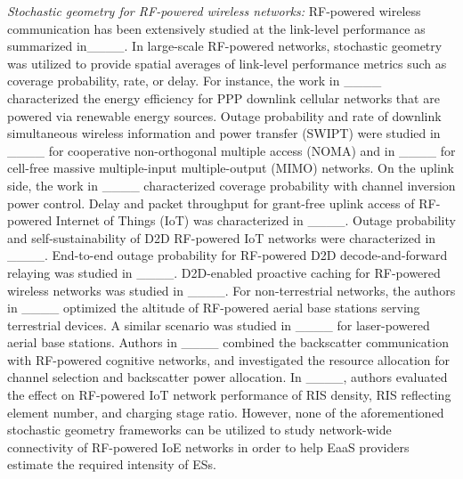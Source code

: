 \indent \textit{Stochastic geometry for
RF-powered wireless networks:} RF-powered wireless communication has been extensively studied at the link-level performance as summarized in____. In large-scale RF-powered networks, stochastic geometry was utilized to provide spatial averages of link-level performance metrics such as coverage probability, rate, or delay. For instance, the work in ____ characterized the energy efficiency for PPP downlink cellular networks that are powered via renewable energy sources. Outage probability and rate of downlink simultaneous wireless information and power transfer (SWIPT) were studied in ____ for cooperative non-orthogonal multiple access (NOMA) and in ____ for cell-free massive multiple-input multiple-output (MIMO) networks. On the uplink side, the work in ____ characterized coverage probability with channel inversion power control. Delay and packet throughput for grant-free uplink access of RF-powered Internet of Things (IoT) was characterized in ____. Outage probability and self-sustainability of D2D RF-powered IoT networks were characterized in ____. End-to-end outage probability for RF-powered D2D decode-and-forward relaying was studied in ____. D2D-enabled proactive caching for RF-powered wireless networks was studied in ____. For non-terrestrial networks, the authors in ____ optimized the altitude of RF-powered aerial base stations serving terrestrial devices. A similar scenario was studied in ____ for laser-powered aerial base stations. Authors in ____ combined the backscatter communication with RF-powered cognitive networks, and investigated the resource allocation for channel selection and backscatter power allocation. In ____, authors evaluated the effect on RF-powered IoT network performance of RIS density, RIS reflecting element number, and charging stage ratio. However, none of the aforementioned stochastic geometry frameworks can be utilized to study network-wide connectivity of RF-powered IoE networks in order to help EaaS providers estimate the required intensity of ESs.
